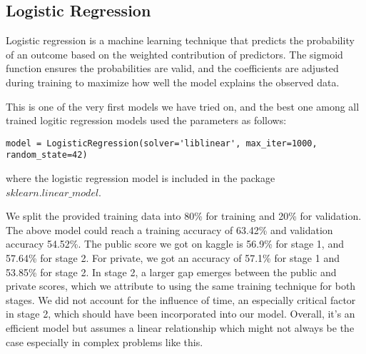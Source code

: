 \subsection*{Logistic Regression}

Logistic regression is a machine learning technique that predicts the probability of an outcome based on the weighted contribution of predictors. The sigmoid function ensures the probabilities are valid, and the coefficients are adjusted during training to maximize how well the model explains the observed data. 

This is one of the very first models we have tried on, and the best one among all trained logitic regression models used the parameters as follows: 

\begin{verbatim}
model = LogisticRegression(solver='liblinear', max_iter=1000, random_state=42)
\end{verbatim}

where the logistic regression model is included in the package $sklearn.linear\_model$.

We split the provided training data into 80\% for training and 20\% for validation. The above model could reach a training accuracy of 63.42\% and validation accuracy 54.52\%. The public score we got on kaggle is 56.9\% for stage 1, and 57.64\% for stage 2. For private, we got an accuracy of 57.1\% for stage 1 and 53.85\% for stage 2. In stage 2, a larger gap emerges between the public and private scores, which we attribute to using the same training technique for both stages. We did not account for the influence of time, an especially critical factor in stage 2, which should have been incorporated into our model. Overall, it's an efficient model but assumes a linear relationship which might not always be the case especially in complex problems like this.
